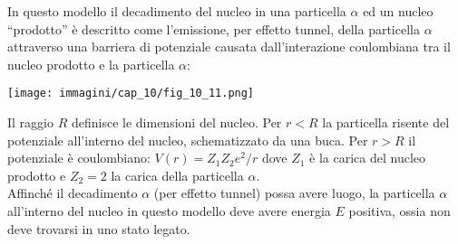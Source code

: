 In questo modello il decadimento del nucleo in una particella $\alpha$ ed un nucleo ``prodotto'' è descritto come l'emissione, per effetto tunnel, della particella $\alpha$ attraverso una barriera di potenziale causata dall'interazione coulombiana tra il nucleo prodotto e la particella $\alpha$:
\begin{center}
\texttt{[image: immagini/cap\_10/fig\_10\_11.png]}
\end{center}
Il raggio $R$ definisce le dimensioni del nucleo. Per $r<R$ la particella risente  del potenziale all'interno del nucleo, schematizzato da una buca. Per $r>R$ il potenziale è coulombiano: $V(r)=Z_1 Z_2 e^2/r$ dove $Z_1$ è la carica del nucleo prodotto e $Z_2=2$ la carica della particella $\alpha$.\\

Affinché il decadimento $\alpha$ (per effetto tunnel) possa avere luogo, la particella $\alpha$ all'interno del nucleo in questo modello deve avere energia $E$ positiva, ossia non deve trovarsi in uno stato legato.\\

